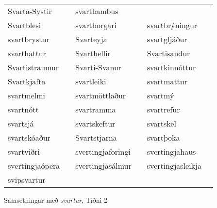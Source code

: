 \documentclass[../samsetningasafn.tex]{subfiles}
\begin{document}
\begin{wordlist}[H]
\begin{tcolorbox}
\begin{tabular}{BlBlBl}
		Svarta-Systir	& 		& 
		svartbambus	& 		\\ 
		Svartblesi		& 		& 	
		svartborgari	& 		& 
		svartbrýningur	& 	\\ 
		svartbrystur	& 		& 	
		Svarteyja		& 		& 
		svartgljáður	& 		\\ 
		svarthattur	& 		& 	
		Svarthellir		& 		& 	
		Svartisandur	& 		\\ 
		Svartistraumur & 		& 
		Svarti-Svanur	& 		& 
		svartkinnóttur	& 		\\ 	
		Svartkjafta	& 		& 		
		svartleiki		& 		& 	
		svartmattur	& 		\\ 	
		svartmelmi	& 	& 
		svartmöttlaður	& 		& 
		svartmý		& 		\\ 	
		svartnótt		& 		& 
		svartramma	& 		& 	
		svartrefur	& 		\\ 	
		svartsjá		& 		& 	
		svartskeftur	& 		 & 	
		svartskel		& 	\\ 	
		svartskóaður	& 		& 	
		Svartstjarna	& 		& 	
		svartþoka	& 		\\ 	
		svartviðri		& 		& 
		svertingjaforingi	& 		& 
		svertingjahaus		& 		\\ 
		svertingjaópera	& 		& 
		svertingjasálmur	& 		& 
		svertingjasleikja	& 		\\ 
		svipsvartur	& 			& 		
					&			&
					&
	\end{tabular}
\end{tcolorbox}
	\caption{Samsetningar með \textit{svartur}, Tíðni 2}
	\label{listi:svart.2}
\end{wordlist}
\end{document}
